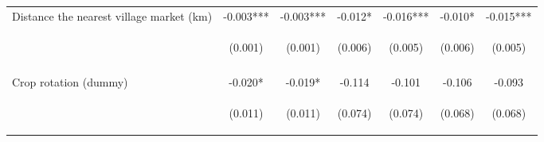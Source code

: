 \begin{center}
\begin{tabular}{lcccccc}
Distance the nearest village market (km) & -0.003*** & -0.003*** & -0.012* & -0.016*** & -0.010* & -0.015*** \\
 & \begin{footnotesize}(0.001)\end{footnotesize} & \begin{footnotesize}(0.001)\end{footnotesize} & \begin{footnotesize}(0.006)\end{footnotesize} & \begin{footnotesize}(0.005)\end{footnotesize} & \begin{footnotesize}(0.006)\end{footnotesize} & \begin{footnotesize}(0.005)\end{footnotesize} \\
\vspace{4pt} & \begin{footnotesize}[0.004]\end{footnotesize} & \begin{footnotesize}[0.000]\end{footnotesize} & \begin{footnotesize}[0.065]\end{footnotesize} & \begin{footnotesize}[0.002]\end{footnotesize} & \begin{footnotesize}[0.078]\end{footnotesize} & \begin{footnotesize}[0.003]\end{footnotesize} \\
Crop rotation (dummy) & -0.020* & -0.019* & -0.114 & -0.101 & -0.106 & -0.093 \\
 & \begin{footnotesize}(0.011)\end{footnotesize} & \begin{footnotesize}(0.011)\end{footnotesize} & \begin{footnotesize}(0.074)\end{footnotesize} & \begin{footnotesize}(0.074)\end{footnotesize} & \begin{footnotesize}(0.068)\end{footnotesize} & \begin{footnotesize}(0.068)\end{footnotesize} \\

\end{tabular}
\end{center}
